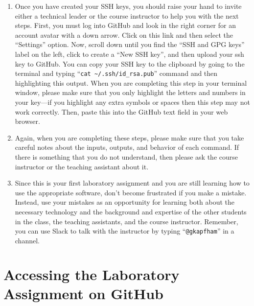 \documentclass[11pt]{article}
\newcommand{\command}[1]{``\lstinline{#1}''}
\begin{document}
\begin{enumerate}
  \item Once you have created your SSH keys, you should raise your hand to
    invite either a technical leader or the course instructor to help you with
    the next steps. First, you must log into GitHub and look in the right corner
    for an account avatar with a down arrow. Click on this link and then select
    the ``Settings'' option. Now, scroll down until you find the ``SSH and GPG
    keys'' label on the left, click to create a ``New SSH key'', and then upload
    your ssh key to GitHub. You can copy your SSH key to the clipboard by going
    to the terminal and typing ``{\tt cat \textasciitilde{}/.ssh/id\_rsa.pub}''
    command and then highlighting this output. When you are completing this step
    in your terminal window, please make sure that you only highlight the
    letters and numbers in your key---if you highlight any extra symbols or
    spaces then this step may not work correctly. Then, paste this into the
    GitHub text field in your web browser.

  \item Again, when you are completing these steps, please make sure that you
    take careful notes about the inputs, outputs, and behavior of each command.
    If there is something that you do not understand, then please ask the course
    instructor or the teaching assistant about it.

  \item Since this is your first laboratory assignment and you are still
    learning how to use the appropriate software, don't become frustrated if you
    make a mistake. Instead, use your mistakes as an opportunity for learning
    both about the necessary technology and the background and expertise of the
    other students in the class, the teaching assistants, and the course
    instructor. Remember, you can use Slack to talk with the instructor by
    typing \command{@gkapfham} in a channel.

\end{enumerate}

\section*{Accessing the Laboratory Assignment on GitHub}
\end{document}
